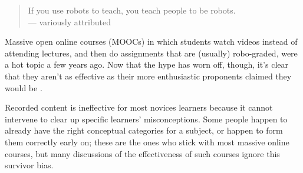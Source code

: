 \begin{quote}
  If you use robots to teach, you teach people to be robots.
  \\
  --- variously attributed
\end{quote}

Massive open online courses (MOOCs) in which students watch videos
instead of attending lectures, and then do assignments that are
(usually) robo-graded, were a hot topic a few years ago.  Now that the
hype has worn off, though, it's clear that they aren't as effective as
their more enthusiastic proponents claimed they would
be \cite{bib:ubell-moocs}.

Recorded content is ineffective for most novices learners because it
cannot intervene to clear up specific learners' misconceptions. Some
people happen to already have the right conceptual categories for a
subject, or happen to form them correctly early on; these are the ones
who stick with most massive online courses, but many discussions of
the effectiveness of such courses ignore this survivor bias.
